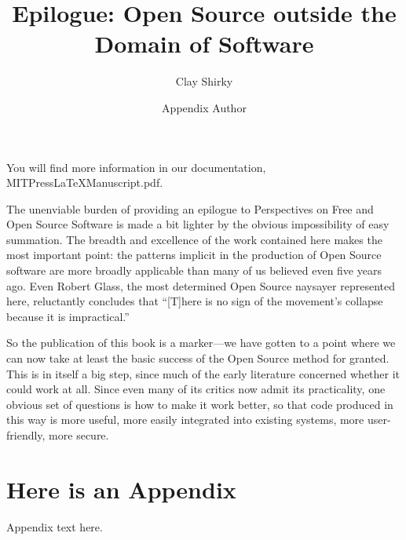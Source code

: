 \documentclass{mitpress}
\begin{document}
You will find more information in our documentation,\\
MITPressLaTeXManuscript.pdf.




\begin{epilogue}
\title{Epilogue: Open Source outside the Domain of Software}
\author{Clay Shirky}

The unenviable burden of providing an epilogue to Perspectives on Free and
Open Source Software is made a bit lighter by the obvious impossibility of
easy summation. The breadth and excellence of the work contained here
makes the most important point: the patterns implicit in the production
of Open Source software are more broadly applicable than many of us
believed even five years ago. Even Robert Glass, the most determined Open
Source naysayer represented here, reluctantly concludes that ``[T]here is no
sign of the movement's collapse because it is impractical.''

So the publication of this book is a marker---we have gotten to a
point where we can now take at least the basic success of the Open
Source method for granted. This is in itself a big step, since much of the
early literature concerned whether it could work at all. Since even many
of its critics now admit its practicality, one obvious set of questions is how
to make it work better, so that code produced in this way is more useful,
more easily integrated into existing systems, more user-friendly, more
secure.

\end{epilogue}


\appendix
\chapter{Here is an Appendix}
\author{Appendix Author}
Appendix text here.



\end{document}
